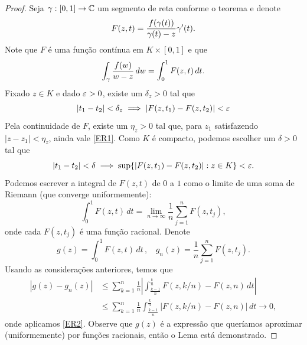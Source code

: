     \begin{proof}
        Seja $\gamma : [0,1] \to \mathbb{C}$ um segmento de reta conforme o teorema e denote
        \begin{equation*}
            F(z,t) = \frac{f(\gamma(t))}{\gamma(t) - z}\gamma'(t).
        \end{equation*}
        Note que $F$ é uma função contínua em $K \times [0,1]$ e que
        \begin{equation*}
            \int_\gamma \frac{f(w)}{w-z}\,dw = \int_{0}^{1}F(z,t)\,dt.
        \end{equation*}
        Fixado $z \in K$ e dado $\varepsilon > 0$, existe um $\delta_z > 0$ tal que
        \begin{equation}
        \label{ER1}
            |t_1 - t_2| < \delta_z \implies |F(z,t_1) - F(z,t_2)| < \varepsilon
        \end{equation}
        Pela continuidade de $F$, existe um $\eta_z > 0$ tal que, para $z_1$ satisfazendo 
        $|z-z_1| < \eta_z$, ainda vale \eqref{ER1}. Como $K$ é compacto, podemos escolher 
        um $\delta > 0$ tal que
        \begin{equation}
        \label{ER2}
            |t_1 - t_2| < \delta \implies \sup \{|F(z,t_1) - F(z,t_2)| : z \in K\} < \varepsilon.   
        \end{equation}
        Podemos escrever a integral de $F(z,t)$ de $0$ a $1$ como o limite de uma soma de Riemann 
        (que converge uniformemente):
        \begin{equation*}
            \int_{0}^{1}F(z,t) \, dt = \lim_{n \to \infty}\frac{1}{n}\sum_{j=1}^{n}F(z,t_j),
        \end{equation*}
        onde cada $F(z,t_j)$ é uma função racional. Denote
        \begin{equation*}
            g(z) = \int_{0}^{1}F(z,t) \, dt \, ,  \ \ \ \ 
            g_n(z) = \frac{1}{n} \sum_{j=1}^n F(z,t_j).
        \end{equation*}
        Usando as considerações anteriores, temos que 
        \begin{align*}
            |g(z) - g_n(z)| 
            &\leq 
            \sum_{k=1}^n
            \frac{1}{n} \left|
              \int_{\frac{k-1}{n}}^{\frac{k}{n}} F(z,k/n) - F(z,n) \, dt 
            \right| \\
            &\leq \sum_{k=1}^{n} \frac{1}{n}
                  \int_{\frac{k-1}{n}}^{\frac{k}{n}} |F(z,k/n) - F(z,n)| \, dt
            \to 0,
        \end{align*}
        onde aplicamos \eqref{ER2}. Observe que $g(z)$ é a expressão que queríamos aproximar
        (uniformemente) por funções racionais, então o Lema está demonstrado.
    \end{proof}
    \\ \\
    
